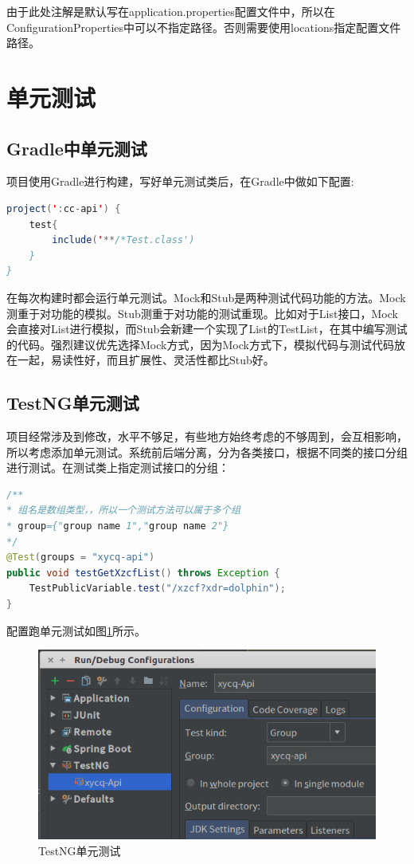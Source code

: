 \documentclass[letter]{book}
\begin{document}
由于此处注解是默认写在application.properties配置文件中，所以在ConfigurationProperties中可以不指定路径。否则需要使用locations指定配置文件路径。

\section{单元测试}

\subsection{Gradle中单元测试}

项目使用Gradle进行构建，写好单元测试类后，在Gradle中做如下配置:

\begin{lstlisting}[language=Java]
project(':cc-api') {	
	test{
		include('**/*Test.class')
	}
}
\end{lstlisting}

在每次构建时都会运行单元测试。Mock和Stub是两种测试代码功能的方法。Mock测重于对功能的模拟。Stub测重于对功能的测试重现。比如对于List接口，Mock会直接对List进行模拟，而Stub会新建一个实现了List的TestList，在其中编写测试的代码。强烈建议优先选择Mock方式，因为Mock方式下，模拟代码与测试代码放在一起，易读性好，而且扩展性、灵活性都比Stub好。

\subsection{TestNG单元测试}

项目经常涉及到修改，水平不够足，有些地方始终考虑的不够周到，会互相影响，所以考虑添加单元测试。系统前后端分离，分为各类接口，根据不同类的接口分组进行测试。在测试类上指定测试接口的分组：

\begin{lstlisting}[language=Java]
/**
* 组名是数组类型，，所以一个测试方法可以属于多个组
* group={"group name 1","group name 2"}
*/
@Test(groups = "xycq-api")
public void testGetXzcfList() throws Exception {
	TestPublicVariable.test("/xzcf?xdr=dolphin");
}
\end{lstlisting}

配置跑单元测试如图\ref{fig:testngunittestbygroup}所示。

\begin{figure}[htbp]
	\centering
	\includegraphics[scale=0.5]{testngunittestbygroup.png}
	\caption{TestNG单元测试}
	\label{fig:testngunittestbygroup}
\end{figure}
\end{document}
